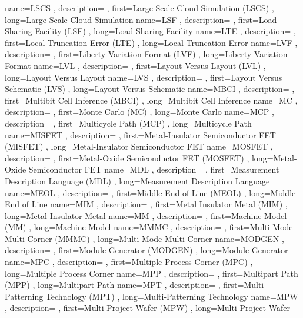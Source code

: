 { name={LSCS}
, description={}
, first={Large-Scale Cloud Simulation (LSCS)}
, long={Large-Scale Cloud Simulation}
}
{ name={LSF}
, description={}
, first={Load Sharing Facility (LSF)}
, long={Load Sharing Facility}
}
{ name={LTE}
, description={}
, first={Local Truncation Error (LTE)}
, long={Local Truncation Error}
}
{ name={LVF}
, description={}
, first={Liberty Variation Format (LVF)}
, long={Liberty Variation Format}
}
{ name={LVL}
, description={}
, first={Layout Versus Layout (LVL)}
, long={Layout Versus Layout}
}
{ name={LVS}
, description={}
, first={Layout Versus Schematic (LVS)}
, long={Layout Versus Schematic}
}
{ name={MBCI}
, description={}
, first={Multibit Cell Inference (MBCI)}
, long={Multibit Cell Inference}
}
{ name={MC}
, description={}
, first={Monte Carlo (MC)}
, long={Monte Carlo}
}
{ name={MCP}
, description={}
, first={Multicycle Path (MCP)}
, long={Multicycle Path}
}
{ name={MISFET}
, description={}
, first={Metal-Insulator Semiconductor FET (MISFET)}
, long={Metal-Insulator Semiconductor FET}
}
{ name={MOSFET}
, description={}
, first={Metal-Oxide Semiconductor FET (MOSFET)}
, long={Metal-Oxide Semiconductor FET}
}
{ name={MDL}
, description={}
, first={Measurement Description Language (MDL)}
, long={Measurement Description Language}
}
{ name={MEOL}
, description={}
, first={Middle End of Line (MEOL)}
, long={Middle End of Line}
}
{ name={MIM}
, description={}
, first={Metal Insulator Metal (MIM)}
, long={Metal Insulator Metal}
}
{ name={MM}
, description={}
, first={Machine Model (MM)}
, long={Machine Model}
}
{ name={MMMC}
, description={}
, first={Multi-Mode Multi-Corner (MMMC)}
, long={Multi-Mode Multi-Corner}
}
{ name={MODGEN}
, description={}
, first={Module Generator (MODGEN)}
, long={Module Generator}
}
{ name={MPC}
, description={}
, first={Multiple Process Corner (MPC)}
, long={Multiple Process Corner}
}
{ name={MPP}
, description={}
, first={Multipart Path (MPP)}
, long={Multipart Path}
}
{ name={MPT}
, description={}
, first={Multi-Patterning Technology (MPT)}
, long={Multi-Patterning Technology}
}
{ name={MPW}
, description={}
, first={Multi-Project Wafer (MPW)}
, long={Multi-Project Wafer}
}
